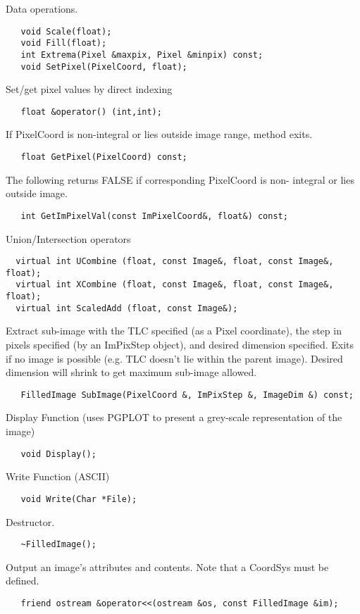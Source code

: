       Data operations.
\begin{verbatim}
   void Scale(float);
   void Fill(float);
   int Extrema(Pixel &maxpix, Pixel &minpix) const;
   void SetPixel(PixelCoord, float);
\end{verbatim}

      Set/get pixel values by direct indexing
\begin{verbatim}
   float &operator() (int,int);
\end{verbatim}

      If PixelCoord is non-integral or lies outside image range,
      method exits.
\begin{verbatim}
   float GetPixel(PixelCoord) const;
\end{verbatim}

      The following returns FALSE if corresponding PixelCoord is non-
      integral or lies outside image.
\begin{verbatim}
   int GetImPixelVal(const ImPixelCoord&, float&) const;
\end{verbatim}

      Union/Intersection operators
\begin{verbatim}
  virtual int UCombine (float, const Image&, float, const Image&, float);
  virtual int XCombine (float, const Image&, float, const Image&, float);
  virtual int ScaledAdd (float, const Image&);
\end{verbatim}

      Extract sub-image with the TLC specified (as a Pixel coordinate), the 
      step in pixels specified (by an ImPixStep object), and desired dimension 
      specified. Exits if no image is possible (e.g. TLC doesn't lie within
      the parent image). Desired dimension will shrink to get maximum sub-image
      allowed.
\begin{verbatim}
   FilledImage SubImage(PixelCoord &, ImPixStep &, ImageDim &) const;
\end{verbatim}

      Display Function (uses PGPLOT to present a grey-scale representation
      of the image)
\begin{verbatim}
   void Display();
\end{verbatim}

      Write Function (ASCII)
\begin{verbatim}
   void Write(Char *File);
\end{verbatim}

      Destructor.
\begin{verbatim}
   ~FilledImage();
\end{verbatim}

      Output an image's attributes and contents. Note that a CoordSys must
      be defined.
\begin{verbatim}
   friend ostream &operator<<(ostream &os, const FilledImage &im);
\end{verbatim}

